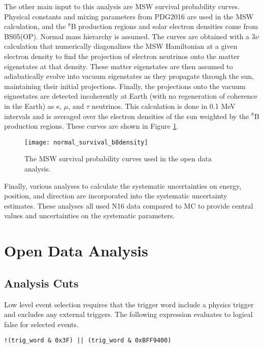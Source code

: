The other main input to this analysis are MSW survival probability curves.
Physical constants and mixing parameters from PDG2016 are used in the MSW
calculation, and the $^8$B production regions and solar electron densities come
from BS05(OP).
Normal mass hierarchy is assumed.
The curves are obtained with a 3$\nu$ calculation that numerically diagonalizes
the MSW Hamiltonian at a given electron density to find the projection of
electron neutrinos onto the matter eigenstates at that density.
These matter eigenstates are then assumed to adiabatically evolve into vacuum
eigenstates as they propagate through the sun, maintaining their initial
projections.
Finally, the projections onto the vacuum eignestates are detected incoherently
at Earth (with no regeneration of coherence in the Earth) as e, $\mu$, and
$\tau$ neutrinos.
This calculation is done in 0.1 MeV intervals and is averaged over the electron
densities of the sun weighted by the $^8$B production regions.
These curves are shown in Figure \ref{fig:solar:msw}.

\begin{figure}
\centering
\texttt{[image: normal\_survival\_b8density]}
\caption{The MSW survival probability curves used in the open data analysis.}
\label{fig:solar:msw}
\end{figure}

Finally, various analyses to calculate the systematic uncertainties on energy,
position, and direction are incorporated into the systematic uncertainty 
estimates. These analyses all used N16 data compared to MC to provide central
values and uncertainties on the systematic parameters.

\section{Open Data Analysis}
\label{sec:solar:opendata}

\subsection{Analysis Cuts}
\label{sec:solar:open_cuts}

Low level event selection requires that the trigger word include a physics
trigger and excludes any external triggers.
The following expression evaluates to logical false for selected events.

\begin{verbatim}
!(trig_word & 0x3F) || (trig_word & 0xBFF9400)
\end{verbatim}

